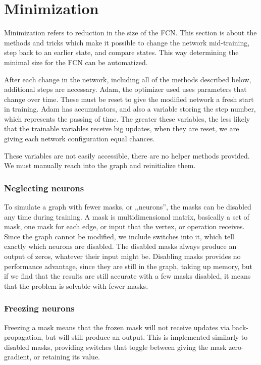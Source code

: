 \documentclass[12pt]{report}
\begin{document}
\section{Minimization}
Minimization refers to reduction in the size of the FCN. This section is about the methods and tricks which make it possible to change the network mid-training, step back to an earlier state, and compare states. This way determining the minimal size for the FCN can be automatized.\par

After each change in the network, including all of the methods described below, additional steps are necessary. Adam, the optimizer used uses parameters that change over time. These must be reset to give the modified network a fresh start in training. Adam has accumulators, and also a variable storing the step number, which represents the passing of time. The greater these variables, the less likely that the trainable variables receive big updates, when they are reset, we are giving each network configuration equal chances.\par

These variables are not easily accessible, there are no helper methods provided. We must manually reach into the graph and reinitialize them.
\subsubsection{Neglecting neurons}
To simulate a graph with fewer masks, or ,,neurons'', the masks can be disabled any time during training. A mask is  multidimensional matrix, basically a set of mask, one mask for each edge, or input that the vertex, or operation receives. Since the graph cannot be modified, we include switches into it, which tell exactly which neurons are disabled. The disabled masks always produce an output of zeros, whatever their input might be. Disabling masks provides no performance advantage, since they are still in the graph, taking up memory, but if we find that the results are still accurate with a few masks disabled, it means that the problem is solvable with fewer masks.
\subsubsection{Freezing neurons}
Freezing a mask means that the frozen mask will not receive updates via back-propagation, but will still produce an output. This is implemented similarly to disabled masks, providing switches that toggle between giving the mask zero-gradient, or retaining its value.
\end{document}
